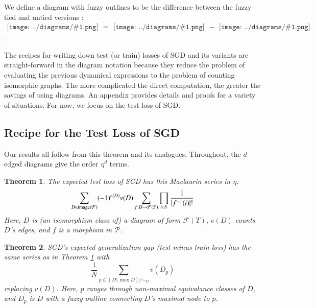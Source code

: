 \documentclass{article}
\newtheorem{thm}{Theorem}
\newcommand{\Free}{\mathcal{F}}
\newcommand{\image}{\text{\textnormal{image}}}
\newcommand{\Pp}{\mathcal{P}}
\newcommand{\sdia}[1]{\begin{gathered}\texttt{[image: ../diagrams/\#1.png]}\end{gathered}}
\begin{document}
    We define a diagram with fuzzy outlines to be the difference between the
    fuzzy tied and untied versions : $\sdia{c(01-2)(01-12)} =
    \sdia{(01-2)(01-12)}-\sdia{(0-1-2)(01-12)}$. 
    
    The recipes for writing down test (or train) losses of SGD and its variants
    are straight-forward in the diagram notation because they reduce the
    problem of evaluating the previous dynamical expressions to the problem of
    counting isomorphic graphs.  The more complicated the direct computation,
    the greater the savings of using diagrams.  An appendix provides details
    and proofs for a variety of situations.  For now, we focus on the test loss
    of SGD.

\subsection{Recipe for the Test Loss of SGD}
    Our results all follow from this theorem and its analogues.
    Throughout, the $d$-edged diagrams give the order $\eta^d$ terms. 
    \begin{thm} \label{thm:test}
        The expected test loss of SGD has this Maclaurin series in $\eta$:
        \begin{equation}\label{eq:sgdcoef}
            \sum_{D \in \image(\Free)} (-1)^{e(D)} v(D) \sum_{f: D\to\Free(S)}
            \prod_{i\in S} \frac{1}{|f^{-1}(i)|!}
        \end{equation}
        Here, $D$ is (an isomorphism class of) a diagram of form
        $\Free(T)$, $e(D)$ counts $D$'s edges, and $f$ is a  
        morphism in $\Pp$.
    \end{thm}
    \begin{thm}
        SGD's expected generalization gap (test minus train loss) has the same
        series as in Theorem \ref{thm:test} with 
        $$
            \frac{1}{N} \sum_{p \in (D\setminus \max D)/\sim_D} v(D_p)
        $$
        replacing $v(D)$.
        Here, $p$ ranges through non-maximal equivalance classes of $D$, and
        $D_p$ is $D$ with a fuzzy outline connecting $D$'s maximal node
        to $p$.
    \end{thm}
\end{document}
